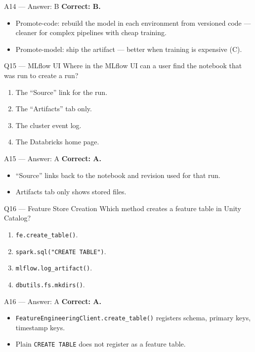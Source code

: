 \documentclass[aspectratio=169,10pt]{beamer}
\begin{document}
	\begin{frame}{A14 — Answer: B}
		\textbf{Correct: B.}
		\begin{itemize}
			\item Promote-code: rebuild the model in each environment from versioned code — cleaner for complex pipelines with cheap training.
			\item Promote-model: ship the artifact — better when training is expensive (C).
		\end{itemize}
	\end{frame}
	
	\begin{frame}{Q15 — MLflow UI}
		Where in the MLflow UI can a user find the notebook that was run to create a run?
		\begin{enumerate}[label=\Alph*.]
			\item The ``Source'' link for the run.
			\item The ``Artifacts'' tab only.
			\item The cluster event log.
			\item The Databricks home page.
		\end{enumerate}
	\end{frame}
	
	\begin{frame}{A15 — Answer: A}
		\textbf{Correct: A.}
		\begin{itemize}
			\item ``Source'' links back to the notebook and revision used for that run.
			\item Artifacts tab only shows stored files.
		\end{itemize}
	\end{frame}
	
	\begin{frame}{Q16 — Feature Store Creation}
		Which method creates a feature table in Unity Catalog?
		\begin{enumerate}[label=\Alph*.]
			\item \texttt{fe.create\_table()}.
			\item \texttt{spark.sql("CREATE TABLE")}.
			\item \texttt{mlflow.log\_artifact()}.
			\item \texttt{dbutils.fs.mkdirs()}.
		\end{enumerate}
	\end{frame}
	
	\begin{frame}{A16 — Answer: A}
		\textbf{Correct: A.}
		\begin{itemize}
			\item \texttt{FeatureEngineeringClient.create\_table()} registers schema, primary keys, timestamp keys.
			\item Plain \texttt{CREATE TABLE} does not register as a feature table.
		\end{itemize}
	\end{frame}
	
\end{document}
